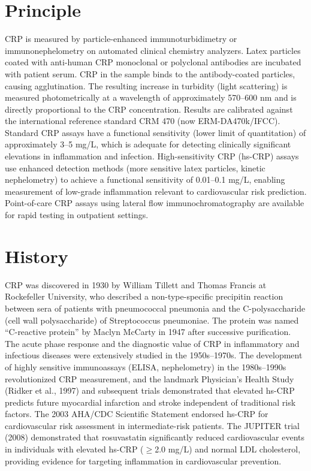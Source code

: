 \section*{Principle}
CRP is measured by particle-enhanced immunoturbidimetry or immunonephelometry on automated clinical chemistry analyzers. Latex particles coated with anti-human CRP monoclonal or polyclonal antibodies are incubated with patient serum. CRP in the sample binds to the antibody-coated particles, causing agglutination. The resulting increase in turbidity (light scattering) is measured photometrically at a wavelength of approximately 570--600 nm and is directly proportional to the CRP concentration. Results are calibrated against the international reference standard CRM 470 (now ERM-DA470k/IFCC). Standard CRP assays have a functional sensitivity (lower limit of quantitation) of approximately 3--5 mg/L, which is adequate for detecting clinically significant elevations in inflammation and infection. High-sensitivity CRP (hs-CRP) assays use enhanced detection methods (more sensitive latex particles, kinetic nephelometry) to achieve a functional sensitivity of 0.01--0.1 mg/L, enabling measurement of low-grade inflammation relevant to cardiovascular risk prediction. Point-of-care CRP assays using lateral flow immunochromatography are available for rapid testing in outpatient settings.

\section*{History}
CRP was discovered in 1930 by William Tillett and Thomas Francis at Rockefeller University, who described a non-type-specific precipitin reaction between sera of patients with pneumococcal pneumonia and the C-polysaccharide (cell wall polysaccharide) of Streptococcus pneumoniae. The protein was named ``C-reactive protein'' by Maclyn McCarty in 1947 after successive purification. The acute phase response and the diagnostic value of CRP in inflammatory and infectious diseases were extensively studied in the 1950s--1970s. The development of highly sensitive immunoassays (ELISA, nephelometry) in the 1980s--1990s revolutionized CRP measurement, and the landmark Physician's Health Study (Ridker et al., 1997) and subsequent trials demonstrated that elevated hs-CRP predicts future myocardial infarction and stroke independent of traditional risk factors. The 2003 AHA/CDC Scientific Statement endorsed hs-CRP for cardiovascular risk assessment in intermediate-risk patients. The JUPITER trial (2008) demonstrated that rosuvastatin significantly reduced cardiovascular events in individuals with elevated hs-CRP ($\geq$2.0 mg/L) and normal LDL cholesterol, providing evidence for targeting inflammation in cardiovascular prevention.

